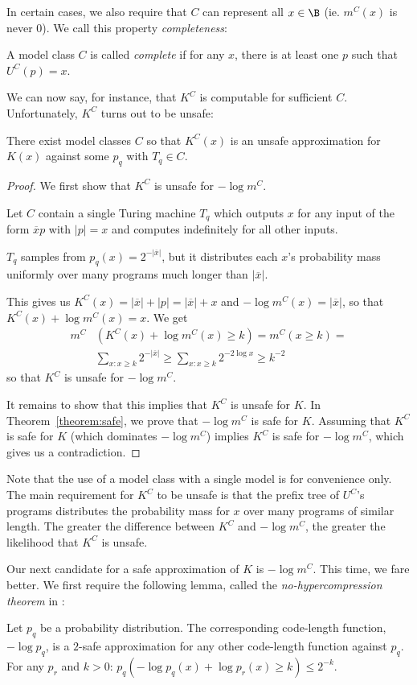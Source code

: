 In certain cases, we also require that $C$ can represent all $x \in \B$ (ie. $m^C(x)$ is never 0). We call this property \emph{completeness}:
\begin{definition}
A model class $C$ is called \emph{complete} if for any $x$, there is at least one $p$ such that $U^C(p) = x$. 
\end{definition}
We can now say, for instance, that $K^C$ is computable for sufficient $C$. Unfortunately, $K^C$ turns out to be unsafe:
\begin{theorem}
There exist model classes $C$ so that $K^C(x)$ is an unsafe approximation for $K(x)$ against some $p_q$ with $T_q \in C$.  \label{theorem:unsafe}
\end{theorem}
\begin{proof}
We first show that $K^C$ is unsafe for $-\log m^C$. 

Let $C$ contain a single Turing machine $T_q$ which outputs $x$ for any input of the form $\overline{x}p$ with $|p| = x$ and computes indefinitely for all other inputs.

$T_q$ samples from $p_q(x) = 2^{-|\overline{x}|}$, but it distributes each $x$'s probability mass uniformly over many programs much longer than $|\overline{x}|$.

This gives us $K^C(x) = |\overline{x}| + |p| = |\overline{x}| + x $ and $-\log m^C(x) = |\overline{x}|$, so that $K^C(x) + \log m^C(x) = x$. We get 
\begin{align*}
m^C&(K^C(x) + \log m^C(x) \geq k) = m^C(x \geq k) = \\
&\sum_{x : x \geq k} 2^{-|\overline{x}|} \geq \sum_{x : x \geq k} 2^{-2 \log x} \geq k^{-2}
\end{align*}
so that $K^C$ is unsafe for $-\log m^C$.

It remains to show that this implies that $K^C$ is unsafe for $K$. In Theorem~\ref{theorem:safe}, we prove that $-\log m^C$ is safe for $K$. Assuming that $K^C$ is safe for $K$ (which dominates $-\log m^C$) implies $K^C$ is safe for $-\log m^C$, which gives us a contradiction.
\end{proof}
Note that the use of a model class with a single model is for convenience only. The main requirement for $K^C$ to be unsafe is that the prefix tree of $U^C$'s programs distributes the probability mass for $x$ over many programs of similar length. The greater the difference between $K^C$ and $- \log m^C$, the greater the likelihood that $K^C$ is unsafe.

Our next candidate for a safe approximation of $K$ is $-\log m^C$. This time, we fare better. We first require the following lemma, called the \emph{no-hypercompression theorem} in \cite[p103]{grunwald2007minimum}:
\begin{lemma}
Let $p_q$ be a probability distribution. The corresponding code-length function, $-\log p_q$, is a $2$-safe approximation for any other code-length function against $p_q$. For any $p_r$ and $k>0$: $
p_q(-\log p_q(x) +  \log p_r(x) \geq k) \leq 2^{-k}$.
\label{lemma:no-hypercompression}
\end{lemma} 

